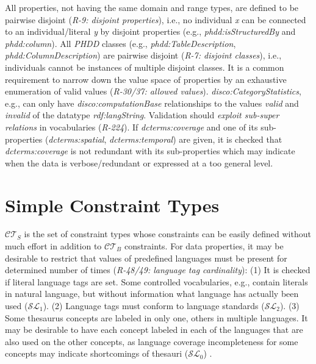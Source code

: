 \documentclass{llncs}
\begin{document}
{All properties, not having the same domain and range types, are defined to be pairwise disjoint
(\emph{R-9: disjoint properties}), i.e., no individual \emph{x} can be connected to an individual/literal \emph{y} by disjoint properties (e.g., \emph{phdd:isStructuredBy} and \emph{phdd:column}).
All \emph{PHDD} classes (e.g., \emph{phdd:TableDescription}, \emph{phdd:ColumnDescription}) are pairwise disjoint (\emph{R-7: disjoint classes}),
i.e., individuals cannot be instances of multiple disjoint classes.
It is a common requirement to narrow down the value space of properties by an exhaustive enumeration of valid values (\emph{R-30/37: allowed values}). 
\emph{disco:CategoryStatistics}, e.g., can only have \emph{disco:computationBase} relationships to the values \emph{valid} and \emph{invalid} of the datatype \emph{rdf:langString}.
Validation should \emph{exploit sub-super relations} in vocabularies (\emph{R-224}).
If \emph{dcterms:coverage} and one of its sub-properties (\emph{dcterms:spatial}, \emph{dcterms:temporal}) are given,
it is checked that \emph{dcterms:coverage} is not redundant with its sub-properties 
which may indicate when the data is verbose/redundant or expressed at a too general level.

\section{Simple Constraint Types}

$\mathcal{CT}_{S}$ is the set of constraint types whose constraints can be easily defined without much effort in addition to $\mathcal{CT}_{B}$ constraints.
For data properties, it may be desirable to restrict that values of predefined languages must be present for determined number of times (\emph{R-48/49: language tag cardinality}):
(1) It is checked if literal language tags are set. Some controlled vocabularies, e.g., contain literals in natural language, but without information what language has actually been used ($\mathcal{SL}_{1}$). 
(2) Language tags must conform to language standards ($\mathcal{SL}_{2}$). 
(3) Some thesaurus concepts are labeled in only one, others in multiple languages. 
It may be desirable to have each concept labeled in each of the languages that are also used on the other concepts,
as language coverage incompleteness for some concepts may indicate shortcomings of thesauri ($\mathcal{SL}_{0}$)
\cite{MaderHaslhoferIsaac2012}.

}
\end{document}
